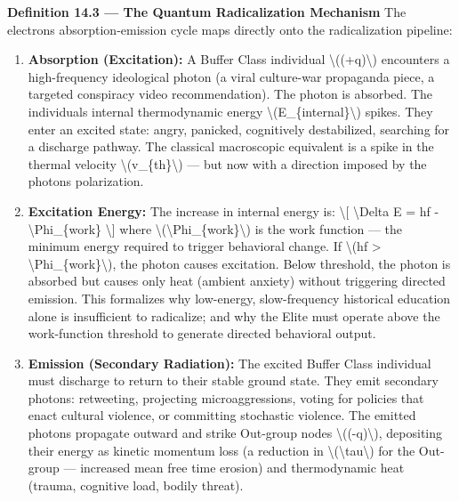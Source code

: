 {\textbf{Definition 14.3 --- The Quantum Radicalization Mechanism} The
electron\textquotesingle s absorption-emission cycle maps directly onto
the radicalization pipeline:

\begin{enumerate}
\tightlist
\item
  \textbf{Absorption (Excitation):} A Buffer Class individual
  \textbackslash((+q)\textbackslash) encounters a high-frequency
  ideological photon (a viral culture-war propaganda piece, a targeted
  conspiracy video recommendation). The photon is absorbed. The
  individual\textquotesingle s internal thermodynamic energy
  \textbackslash(E\_\{internal\}\textbackslash) spikes. They enter an
  excited state: angry, panicked, cognitively destabilized, searching
  for a discharge pathway. The classical macroscopic equivalent is a
  spike in the thermal velocity \textbackslash(v\_\{th\}\textbackslash)
  --- but now with a direction imposed by the photon\textquotesingle s
  polarization.
\item
  \textbf{Excitation Energy:} The increase in internal energy is:
  \textbackslash{[} \textbackslash Delta E = hf -
  \textbackslash Phi\_\{work\} \textbackslash{]} where
  \textbackslash(\textbackslash Phi\_\{work\}\textbackslash) is the work
  function --- the minimum energy required to trigger behavioral change.
  If \textbackslash(hf \textgreater{}
  \textbackslash Phi\_\{work\}\textbackslash), the photon causes
  excitation. Below threshold, the photon is absorbed but causes only
  heat (ambient anxiety) without triggering directed emission. This
  formalizes why low-energy, slow-frequency historical education alone
  is insufficient to radicalize; and why the Elite must operate above
  the work-function threshold to generate directed behavioral output.
\item
  \textbf{Emission (Secondary Radiation):} The excited Buffer Class
  individual must discharge to return to their stable ground state. They
  emit secondary photons: retweeting, projecting microaggressions,
  voting for policies that enact cultural violence, or committing
  stochastic violence. The emitted photons propagate outward and strike
  Out-group nodes \textbackslash((-q)\textbackslash), depositing their
  energy as kinetic momentum loss (a reduction in
  \textbackslash(\textbackslash tau\textbackslash) for the Out-group ---
  increased mean free time erosion) and thermodynamic heat (trauma,
  cognitive load, bodily threat).
\end{enumerate}

}
